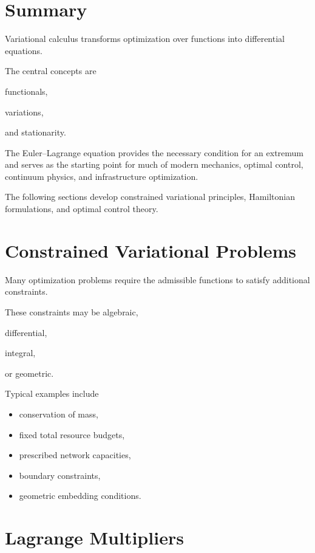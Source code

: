 \documentclass[11pt,fleqn]{book}
\numberwithin{equation}{chapter}
\theoremstyle{plain}
\theoremstyle{definition}
\theoremstyle{remark}
\begin{document}

\section{Summary}

Variational calculus transforms optimization over functions into
differential equations.

The central concepts are

functionals,

variations,

and stationarity.

The Euler--Lagrange equation provides the necessary condition for an
extremum and serves as the starting point for much of modern mechanics,
optimal control, continuum physics, and infrastructure optimization.

The following sections develop constrained variational principles,
Hamiltonian formulations, and optimal control theory.


\section{Constrained Variational Problems}

Many optimization problems require the admissible functions to satisfy
additional constraints.

These constraints may be algebraic,

differential,

integral,

or geometric.

Typical examples include

\begin{itemize}
\item conservation of mass,
\item fixed total resource budgets,
\item prescribed network capacities,
\item boundary constraints,
\item geometric embedding conditions.
\end{itemize}


\section{Lagrange Multipliers}
\end{document}
